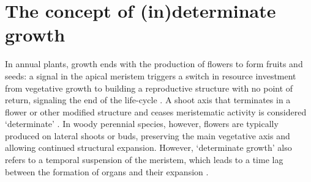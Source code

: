 \documentclass{article}
\begin{document}
								

				
								
\section*{The concept of (in)determinate growth}

	In annual plants, growth ends with the production of flowers to form fruits and seeds: a signal in the apical meristem triggers a switch in resource investment from vegetative growth to building a reproductive structure with no point of return, signaling the end of the life-cycle \citep{poethigPhaseChangeRegulation2003, huijserControlDevelopmentalPhase2011}. A shoot axis that terminates in a flower or other modified structure and ceases meristematic activity is considered `determinate' \citep{barthelemyPlantArchitectureDynamic2007}. In woody perennial species, however, flowers are typically produced on lateral shoots or buds, preserving the main vegetative axis and allowing continued structural expansion. However, `determinate growth' also refers to a temporal suspension of the meristem, which leads to a time lag between the formation of organs and their expansion \citep{kozlowskiSeedGerminationOntogeny2012, halleTropicalTreesForests1978}. \\
	
	
	
\end{document}

